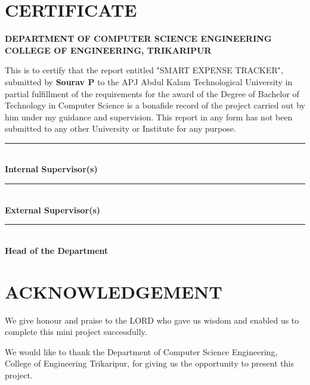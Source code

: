 \documentclass[12pt,a4paper]{article}
\begin{document}
\newpage

\section*{CERTIFICATE}
\begin{center}
    \textbf{DEPARTMENT OF COMPUTER SCIENCE ENGINEERING} \\
    \textbf{COLLEGE OF ENGINEERING, TRIKARIPUR}
\end{center}
\vspace{1cm}
This is to certify that the report entitled "SMART EXPENSE TRACKER", submitted by \textbf{Sourav P} to the APJ Abdul Kalam Technological University in partial fulfillment of the requirements for the award of the Degree of Bachelor of Technology in Computer Science is a bonafide record of the project carried out by him under my guidance and supervision. This report in any form has not been submitted to any other University or Institute for any purpose.

\vspace{3cm}
\noindent
\begin{minipage}[t]{0.3\textwidth}
    \centering
    \rule{4cm}{0.4pt} \\
    \textbf{Internal Supervisor(s)}
\end{minipage}
\hfill
\begin{minipage}[t]{0.3\textwidth}
    \centering
    \rule{4cm}{0.4pt} \\
    \textbf{External Supervisor(s)}
\end{minipage}
\hfill
\begin{minipage}[t]{0.3\textwidth}
    \centering
    \rule{4cm}{0.4pt} \\
    \textbf{Head of the Department}
\end{minipage}

\newpage

\section*{ACKNOWLEDGEMENT}
We give honour and praise to the LORD who gave us wisdom and enabled us to complete this mini project successfully.

We would like to thank the Department of Computer Science Engineering, College of Engineering Trikaripur, for giving us the opportunity to present this project.
\end{document}
